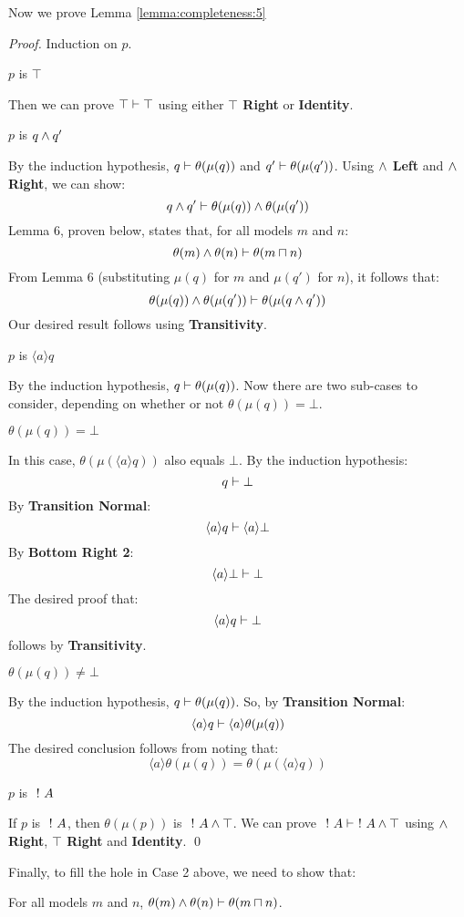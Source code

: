 Now we prove Lemma \ref{lemma:completeness:5}

\begin{proof}
Induction on $p$.

\setcounter{mycase}{0}

\begin{mycase}
$p$ is $\top$
\end{mycase}
Then we can prove  $\top \vdash \top$ using either {\bf $\top$ Right} or {\bf Identity}.

\begin{mycase}
$p$ is $q \land q'$
\end{mycase}
By the induction hypothesis, $q \vdash \theta(\mu(q))$ and $q' \vdash \theta(\mu(q'))$.
Using {\bf $\land$ Left} and {\bf $\land$ Right}, we can show:
\[
q \land q' \vdash \theta(\mu(q)) \land \theta(\mu(q'))
\]
Lemma 6, proven below, states that, for all models $m$ and $n$:
\[
\theta(m) \land \theta(n) \vdash \theta (m \sqcap n)
\]
From Lemma 6 (substituting $\mu(q)$ for $m$ and $\mu(q')$ for $n$), it follows that:
\[
\theta(\mu(q)) \land \theta(\mu(q')) \vdash \theta(\mu(q \land q'))
\]
Our desired result follows using {\bf Transitivity}.

\begin{mycase}
$p$ is $\langle a \rangle q$
\end{mycase}
By the induction hypothesis, $q \vdash \theta(\mu(q))$.
Now there are two sub-cases to consider, depending on whether or not $\theta(\mu(q)) = \bot$.
\begin{subcase}
$\theta(\mu(q)) = \bot$
\end{subcase}
In this case, $\theta(\mu(\langle a \rangle q))$ also equals $\bot$. 
By the induction hypothesis:
\[
q \vdash \bot
\]
By {\bf Transition Normal}:
\[
\langle a \rangle q \vdash \langle a \rangle \bot
\]
By {\bf Bottom Right 2}:
\[
\langle a \rangle \bot \vdash \bot
\]
The desired proof that:
\[
\langle a \rangle q \vdash \bot
\]
follows by {\bf Transitivity}.
\begin{subcase}
$\theta(\mu(q)) \neq \bot$
\end{subcase}
By the induction hypothesis, $q \vdash \theta(\mu(q))$.
So, by {\bf Transition Normal}:
\[
\langle a \rangle q \vdash \langle a \rangle \theta(\mu(q))
\]
The desired conclusion follows from noting that:
\[
 \langle a \rangle \theta(\mu(q)) = \theta(\mu(\langle a \rangle q))
 \]
 \begin{mycase}
$p$ is $\ ! \  A$
\end{mycase}
If $p$ is $\ ! \  A$, then $ \theta(\mu(p))$ is $\ ! \  A \land \top$.
We can prove $\ ! \  A \vdash \ ! \  A \land \top$ using {\bf $\land$ Right}, {\bf $\top$ Right} and {\bf Identity}.
\qed
\end{proof}
Finally, to fill the hole in Case 2 above, we need to show that:
\begin{lemma}
For all models $m$ and $n$, $\theta(m) \land \theta(n) \vdash \theta (m \sqcap n)$.
\end{lemma}

